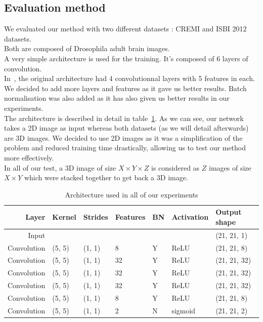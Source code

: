 \subsection{Evaluation method}
We evaluated our method with two different datasets : CREMI and ISBI 2012 datasets.\\
Both are composed of Drosophila adult brain images.\\

A very simple architecture is used for the training.
It's composed of 6 layers of convolution.\\
In~\cite{turaga_maximin_2009}, the original architecture had 4 convolutionnal
layers with 5 features in each. We decided to add more layers and features as
it gave us better results. 
Batch normalisation was also added as it has also given us better results in
our experiments.\\

The architecture is described in detail in table~\ref{tab:archi}. As we can
see, our network takes a 2D image as input whereas both datasets (as we will
detail afterwards) are 3D images. We decided to use 2D images as it was a
simplification of the problem and reduced training time drastically, allowing
us to test our method more effectively.\\
In all of our test, a 3D image of size $X\times Y\times Z$ is considered as $Z$
images of size $X\times Y$ which were stacked together to get back a 3D image.\\

\begin{table}[!htbp]
	\centering
	\begin{tabular}{rllllll}\toprule
		Layer & Kernel & Strides & Features & BN &  Activation & Output shape \\
		\midrule
		Input  &  &  & & & & (21, 21, 1)  \\
		Convolution & (5, 5) & (1, 1) & 8 & Y & ReLU  & (21, 21, 8)  \\
		Convolution & (5, 5) & (1, 1) & 32 & Y & ReLU  & (21, 21, 32)  \\
		Convolution & (5, 5) & (1, 1) & 32 & Y & ReLU  & (21, 21, 32)  \\
		Convolution & (5, 5) & (1, 1) & 32 & Y & ReLU  & (21, 21, 32)  \\
		Convolution & (5, 5) & (1, 1) & 8 & Y & ReLU  & (21, 21, 8)  \\
		Convolution & (5, 5) & (1, 1) & 2 & N & sigmoid  & (21, 21, 2)  \\
		\bottomrule
	\end{tabular}
	\caption{Architecture used in all of our experiments}
	\label{tab:archi}
\end{table}


